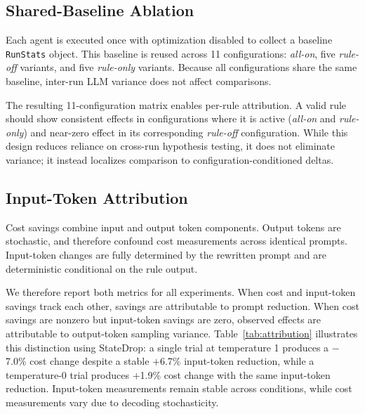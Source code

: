\documentclass[sigconf,9pt]{acmart}
\begin{document}
\subsection{Shared-Baseline Ablation}

Each agent is executed once with optimization disabled to collect a baseline
\texttt{RunStats} object. This baseline is reused across 11 configurations:
\textit{all-on}, five \textit{rule-off} variants, and five \textit{rule-only}
variants. Because all configurations share the same baseline, inter-run LLM variance
does not affect comparisons.

The resulting 11-configuration matrix enables per-rule attribution. A valid rule
should show consistent effects in configurations where it is active (\textit{all-on}
and \textit{rule-only}) and near-zero effect in its corresponding \textit{rule-off}
configuration. While this design reduces reliance on cross-run hypothesis testing, it
does not eliminate variance; it instead localizes comparison to
configuration-conditioned deltas.

\subsection{Input-Token Attribution}

Cost savings combine input and output token components. Output tokens are stochastic,
and therefore confound cost measurements across identical prompts. Input-token changes
are fully determined by the rewritten prompt and are deterministic conditional on the
rule output.

We therefore report both metrics for all experiments. When cost and input-token
savings track each other, savings are attributable to prompt reduction. When cost
savings are nonzero but input-token savings are zero, observed effects are attributable
to output-token sampling variance. Table~\ref{tab:attribution} illustrates this
distinction using StateDrop: a single trial at temperature 1 produces a $-$7.0\% cost
change despite a stable $+$6.7\% input-token reduction, while a temperature-0 trial
produces $+$1.9\% cost change with the same input-token reduction. Input-token
measurements remain stable across conditions, while cost measurements vary due to
decoding stochasticity.
\end{document}
